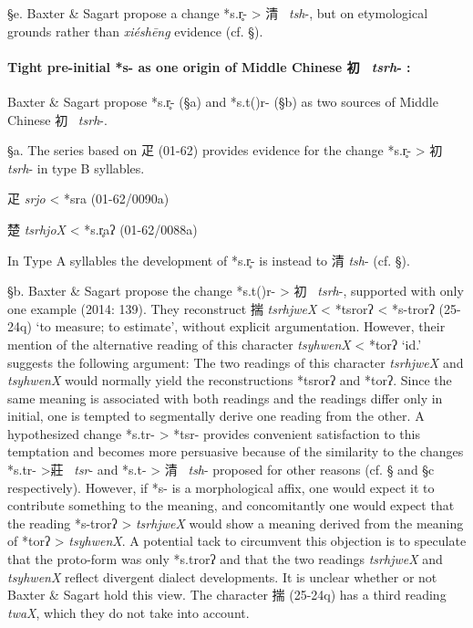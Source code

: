 §e. Baxter \& Sagart propose a change *s.r̥{}- \textgreater{}
清~ \emph{tsh}-, but on etymological grounds rather than  \emph{xiéshēng}
evidence (cf. §).

\paragraph{Tight pre-initial *s- as
one origin of Middle Chinese
初~ \emph{tsrh}- :} Baxter \& Sagart
propose *s.r̥- (§a) and *s.t{}({})r- (§b) as two sources of Middle Chinese
初~ \emph{tsrh}-.

§a. The series based on 疋 (01-62) provides evidence for the change
*s.r̥- \textgreater{} 初 \emph{tsrh}- in type B syllables.

\begin{description} \item
疋  \emph{srjo} \textless{} *sra (01-62/0090a)
 \item
楚  \emph{tsrhjoX} \textless{} *s.r̥aʔ (01-62/0088a)
\end{description}

In Type A syllables the development of *s.r̥- is instead to 清
 \emph{tsh}- (cf. §).

§b. Baxter \& Sagart propose the change *s.t{}({})r- \textgreater{}
初 \emph{~tsrh}-, supported with only one example (2014: 139). They
reconstruct 揣 \emph{tsrhjweX} \textless{} *ts{}rorʔ \textless{}
*s-t{}rorʔ (25-24q) `to measure; to estimate', without explicit
argumentation. However, their mention of the alternative reading of this
character \emph{tsyhwenX} \textless{} *t{}orʔ `id.' suggests the
following argument: The two readings of this character \emph{tsrhjweX}
and \emph{tsyhwenX }would normally yield the reconstructions *ts{}rorʔ
and *t{}orʔ. Since the same meaning is associated with both readings and
the readings differ only in initial, one is tempted to segmentally
derive one reading from the other. A hypothesized change *s.t{}r-
\textgreater{} *ts{}r- provides convenient satisfaction to this
temptation and becomes more persuasive because of the similarity to the
changes *s.t{}r- \textgreater{}莊~ \emph{tsr}- and *s.t{}{}- \textgreater{}
清~ \emph{tsh}- proposed for other reasons (cf. § and §c respectively).
However, if *s- is a morphological affix, one would expect it to
contribute something to the meaning, and concomitantly one would expect
that the reading *s-t{}rorʔ \textgreater{}  \emph{tsrhjweX} would show a
meaning derived from the meaning of *t{}orʔ \textgreater{}
 \emph{tsyhwenX}. A potential tack to circumvent this objection is to
speculate that the proto-form was only *s.t{}rorʔ and that the two
readings \emph{tsrhjweX} and \emph{tsyhwenX} reflect di­ver­gent dialect
developments. It is unclear whether or not Baxter \& Sagart hold this
view. The character 揣 (25-24q) has a third reading \emph{twaX}, which
they do not take into account.


